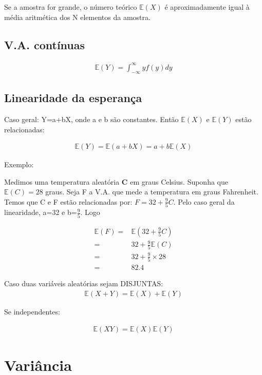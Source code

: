 \documentclass[11pt,a4paper]{article}
\begin{document}
			Se a amostra for grande, o número teórico $\mathbb{E}(X)$ é aproximadamente igual à média aritmética dos N elementos da amostra.
	
		\subsection{V.A. contínuas}
	
		\begin{eqnarray*}
			\mathbb{E}(Y)=\int_{-\infty}^{\infty} yf(y)dy
		\end{eqnarray*}
		
		\subsection{Linearidade da esperança}
		
		Caso geral: Y=a+bX, onde a e b são constantes.
		Então $\mathbb{E}(X)$ e $\mathbb{E}(Y)$ estão relacionadas:
		
		\begin{eqnarray*}
			\mathbb{E}(Y)=\mathbb{E}(a+bX)=a+b\mathbb{E}(X)
		\end{eqnarray*}
		
		Exemplo:
		
		Medimos uma temperatura aleatória \textbf{C} em graus Celsius.
		Suponha que $\mathbb{E}(C)=28$ graus.
		Seja F a V.A. que mede a temperatura em graus Fahrenheit.
		Temos que C e F estão relacionadas por: $F=32+\frac{9}{5}C$.
		Pelo caso geral da linearidade, a=32 e b=$\frac{9}{5}$.
		Logo
		
		\begin{eqnarray*}
			\mathbb{E}(F)=&\mathbb{E}(32+\frac{9}{5}C)\\
			=&32+\frac{9}{5}\mathbb{E}(C)\\
			=&32+\frac{9}{5}\times 28\\
			=&82.4
		\end{eqnarray*}
		
		Caso duas variáveis aleatórias sejam DISJUNTAS:
		\begin{eqnarray*}
			\mathbb{E}(X+Y)=\mathbb{E}(X)+\mathbb{E}(Y)
		\end{eqnarray*}
		
		Se independentes:
		
		\begin{eqnarray*}
			\mathbb{E}(XY)=\mathbb{E}(X)\mathbb{E}(Y)
		\end{eqnarray*}
		
		\section{Variância}
		
\end{document}
